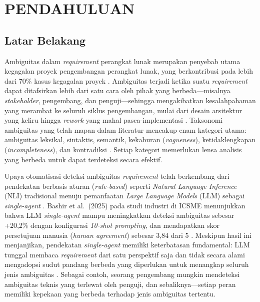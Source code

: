 \chapter{PENDAHULUAN}

\section{Latar Belakang}

Ambiguitas dalam \textit{requirement} perangkat lunak merupakan penyebab utama kegagalan proyek pengembangan perangkat lunak, yang berkontribusi pada lebih dari 70\% kasus kegagalan proyek \cite{chaos1995,wiegers2003}. Ambiguitas terjadi ketika suatu \textit{requirement} dapat ditafsirkan lebih dari satu cara oleh pihak yang berbeda—misalnya \textit{stakeholder}, pengembang, dan penguji—sehingga mengakibatkan kesalahpahaman yang merambat ke seluruh siklus pengembangan, mulai dari desain arsitektur yang keliru hingga \textit{rework} yang mahal pasca-implementasi \cite{berry2000, kamsties1998}. Taksonomi ambiguitas yang telah mapan dalam literatur mencakup enam kategori utama: ambiguitas leksikal, sintaktis, semantik, kekaburan (\textit{vagueness}), ketidaklengkapan (\textit{incompleteness}), dan kontradiksi \cite{berry2004, kamsties1998}. Setiap kategori memerlukan lensa analisis yang berbeda untuk dapat terdeteksi secara efektif.

Upaya otomatisasi deteksi ambiguitas \textit{requirement} telah berkembang dari pendekatan berbasis aturan (\textit{rule-based}) seperti \textit{Natural Language Inference} (NLI) tradisional \cite{ferrara2014} menuju pemanfaatan \textit{Large Language Models} (LLM) sebagai \textit{single-agent} \cite{bashir2025}. Bashir et al.\ (2025) pada studi industri di ICSME menunjukkan bahwa LLM \textit{single-agent} mampu meningkatkan deteksi ambiguitas sebesar +20,2\% dengan konfigurasi \textit{10-shot prompting}, dan mendapatkan skor persetujuan manusia (\textit{human agreement}) sebesar 3,84 dari 5 \cite{bashir2025}. Meskipun hasil ini menjanjikan, pendekatan \textit{single-agent} memiliki keterbatasan fundamental: LLM tunggal membaca \textit{requirement} dari satu perspektif saja dan tidak secara alami mengadopsi sudut pandang berbeda yang diperlukan untuk menangkap seluruh jenis ambiguitas \cite{bashir2025, vijayvargiya2025}. Sebagai contoh, seorang pengembang mungkin mendeteksi ambiguitas teknis yang terlewat oleh penguji, dan sebaliknya—setiap peran memiliki kepekaan yang berbeda terhadap jenis ambiguitas tertentu.

